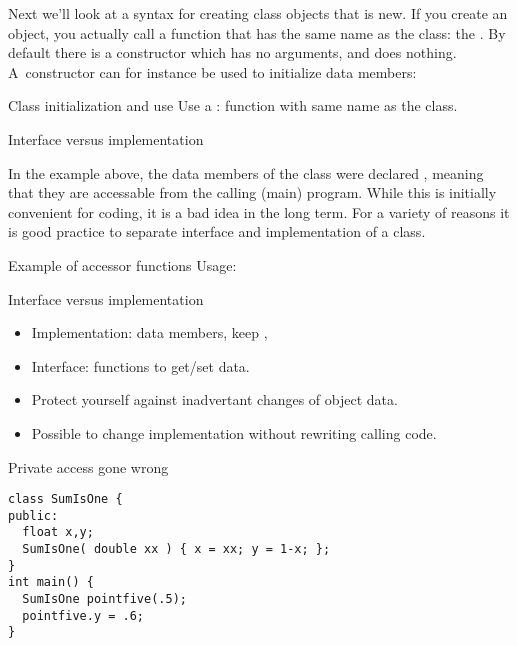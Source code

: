 Next we'll look at a syntax for creating class objects that is new. If
you create an object, you actually call a function that has the same
name as the class: the . By default there is a
constructor which has no arguments, and does nothing. A~constructor
can for instance be used to initialize data members:
%

\begin{slide}{Class initialization and use}
  \label{sl:class-construct}
  Use a : function with same name as the class.
\end{slide}

 {Interface versus implementation}

In the example above, the data members of the  class were
declared , meaning that they are accessable from the calling
(main) program. While this is initially convenient for coding, it is a bad idea
in the long term. For a variety of reasons it is good practice to
separate interface and implementation of a class.

\begin{block}{Example of accessor functions}
  \label{sl:pointaccess}
  Usage:
\end{block}

\begin{block}{Interface versus implementation}
  \label{sl:interfaceimpl}
  \begin{itemize}
  \item Implementation: data members, keep ,
  \item Interface:  functions to get/set data.
  \item Protect yourself against inadvertant changes of object data.
  \item Possible to change implementation without rewriting calling code.
  \end{itemize}
\end{block}

\begin{block}{Private access gone wrong}
  \label{sl:privatenogood}
\begin{verbatim}
class SumIsOne {
public: 
  float x,y;
  SumIsOne( double xx ) { x = xx; y = 1-x; };
}
int main() {
  SumIsOne pointfive(.5);
  pointfive.y = .6;
}
\end{verbatim}
\end{block}

